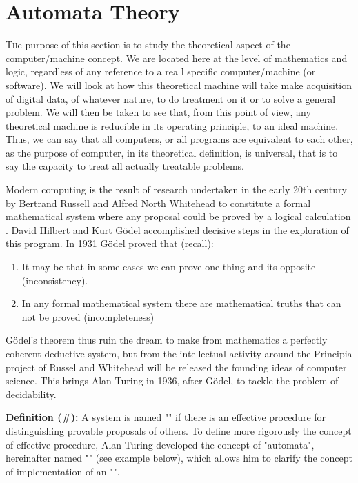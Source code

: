 	\newpage
	\thispagestyle{empty}
	\mbox{}
	\section{Automata Theory}\label{automata theory}
	\lettrine[lines=4]{\color{BrickRed}T}he purpose of this section is to study the theoretical aspect of the computer/machine concept. We are located here at the level of mathematics and logic, regardless of any reference to a rea l specific computer/machine (or software). We will look at how this theoretical machine will take make acquisition of digital data, of whatever nature, to do treatment on it or to solve a general problem. We will then be taken to see that, from this point of view, any theoretical machine is reducible in its operating principle, to an ideal machine. Thus, we can say that all computers, or all programs are equivalent to each other, as the purpose of computer, in its theoretical definition, is universal, that is to say the capacity to treat all actually treatable problems.
	
	Modern computing is the result of research undertaken in the early 20th century by Bertrand Russell and Alfred North Whitehead to constitute a formal mathematical system where any proposal could be proved by a logical calculation . David Hilbert and Kurt Gödel accomplished decisive steps in the exploration of this program. In 1931 Gödel proved that (recall):
	\begin{enumerate}
		\item It may be that in some cases we can prove one thing and its opposite (inconsistency).
		
		\item In any formal mathematical system there are mathematical truths that can not be proved (incompleteness)
	\end{enumerate}
	Gödel's theorem thus ruin the dream to make from mathematics a perfectly coherent deductive system, but from the intellectual activity around the Principia project of Russel and Whitehead will be released the founding ideas of computer science. This brings Alan Turing in 1936, after Gödel, to tackle the problem of decidability.
	
	\textbf{Definition (\#\mydef):} A system is named "" if there is an effective procedure for distinguishing provable proposals of others. To define more rigorously the concept of effective procedure, Alan Turing developed the concept of "automata", hereinafter named "" (see example below), which allows him to clarify the concept of implementation of an "".
	
